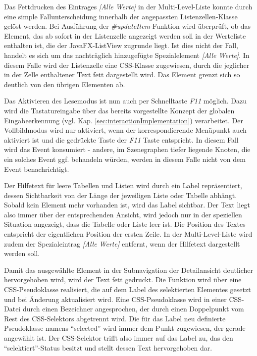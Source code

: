 Das Fettdrucken des Eintrages \textit{[Alle Werte]} in der Multi-Level-Liste konnte durch eine simple Fallunterscheidung innerhalb der angepassten Listenzellen-Klasse gelöst werden. Bei Ausführung der \textit{\#{}updateItem}-Funktion wird überprüft, ob das Element, das ab sofort in der Listenzelle angezeigt werden soll in der Werteliste enthalten ist, die der JavaFX-ListView zugrunde liegt. Ist dies nicht der Fall, handelt es sich um das nachträglich hinzugefügte Spezialelement \textit{[Alle Werte]}. In diesem Falle wird der Listenzelle eine CSS-Klasse zugewiesen, durch die jeglicher in der Zelle enthaltener Text fett dargestellt wird. Das Element grenzt sich so deutlich von den übrigen Elementen ab.\par
{}
Das Aktivieren des Lesemodus ist nun auch per Schnelltaste \textit{F11} möglich. Dazu wird die Tastatureingabe über das bereits vorgestellte Konzept der globalen Eingabeerkennung (vgl. Kap. \ref{sec:interactionImplementation}) verarbeitet. Der Vollbildmodus wird nur aktiviert, wenn der korrespondierende Menüpunkt auch aktiviert ist und die gedrückte Taste der \textit{F11} Taste entspricht. In diesem Fall wird das Event konsumiert - andere, im Szenegraphen tiefer liegende Knoten, die ein solches Event ggf. behandeln würden, werden in diesem Falle nicht von dem Event benachrichtigt.\par
{}
Der Hilfetext für leere Tabellen und Listen wird durch ein Label repräsentiert, dessen Sichtbarkeit von der Länge der jeweiligen Liste oder Tabelle abhängt. Sobald kein Element mehr vorhanden ist, wird das Label sichtbar. Der Text liegt also immer über der entsprechenden Ansicht, wird jedoch nur in der speziellen Situation angezeigt, dass die Tabelle oder Liste leer ist. Die Position des Textes entspricht der eigentlichen Position der ersten Zeile. In der Multi-Level-Liste wird zudem der Spezialeintrag \textit{[Alle Werte]} entfernt, wenn der Hilfetext dargestellt werden soll.\par
{}
Damit das ausgewählte Element in der Subnavigation der Detailansicht deutlicher hervorgehoben wird, wird der Text fett gedruckt. Die Funktion wird über eine CSS-Pseudoklasse realisiert, die auf dem Label des selektierten Elementes gesetzt und bei Änderung aktualisiert wird. Eine CSS-Pseudoklasse wird in einer CSS-Datei durch einen Bezeichner angesprochen, der durch einen Doppelpunkt vom Rest des CSS-Selektors abgetrennt wird. Die für das Label neu definierte Pseudoklasse namens \enquote{selected} wird immer dem Punkt zugewiesen, der gerade angewählt ist. Der CSS-Selektor trifft also immer auf das Label zu, das den \enquote{selektiert}-Status besitzt und stellt dessen Text hervorgehoben dar.\par
